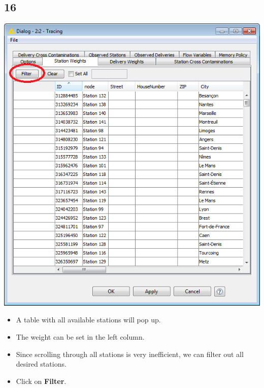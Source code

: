 \documentclass{beamer}
\begin{document}
\subsection{16}
\begin{frame}
	\begin{center}
  		\includegraphics[height=0.6\textheight]{16.png}
	\end{center}
	\begin{itemize}
		\item A table with all available stations will pop up.
		\item The weight can be set in the left column.
		\item Since scrolling through all stations is very inefficient, we can filter out all desired stations.
		\item Click on \textbf{Filter}.
	\end{itemize}
\end{frame}
\end{document}
